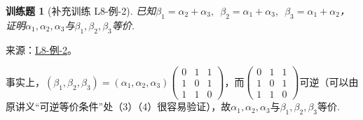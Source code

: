\documentclass[12pt,fontset=fandol]{ctexart}
\newtheorem{exercise}{训练题}[section]
\begin{document}
\begin{exercise}[补充训练 L8-例-2]\label{prob:L8-例-2}
已知$\beta_1=\alpha_2+\alpha_3,\enspace\beta_2=\alpha_1+\alpha_3,\enspace\beta_3=\alpha_1+\alpha_2$，证明$\alpha_1,\alpha_2,\alpha_3$与$\beta_1,\beta_2,\beta_3$等价.
\end{exercise}
\noindent 来源：\href{https://github.com/yhwu-is/Linear-Algebra-Left-Undone/blob/new/%E8%AE%B2%E4%B9%89/%E4%B8%93%E9%A2%98/8%20%E7%9B%B8%E6%8A%B5%E6%A0%87%E5%87%86%E5%BD%A2.tex}{L8-例-2}。
\begin{solve}
事实上，$(\beta_1,\beta_2,\beta_3)=(\alpha_1,\alpha_2,\alpha_3)\begin{pmatrix}
            0 & 1 & 1 \\
            1 & 0 & 1 \\
            1 & 1 & 0
        \end{pmatrix}$，而$\begin{pmatrix}
            0 & 1 & 1 \\
            1 & 0 & 1 \\
            1 & 1 & 0
        \end{pmatrix}$可逆（可以由原讲义“可逆等价条件”处（3）（4）很容易验证），故$\alpha_1,\alpha_2,\alpha_3$与$\beta_1,\beta_2,\beta_3$等价.
\end{solve}
\end{document}
